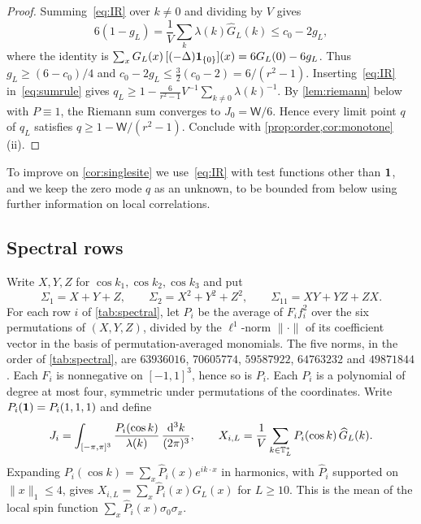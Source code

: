 \begin{proof}
Summing~\eqref{eq:IR} over $k\ne0$ and dividing by $V$ gives
\[
 6(1-g_L)=\frac1V\sum_k\lambda(k)\widehat G_L(k)\le c_0-2g_L,
\]
where the identity is $\sum_x G_L(x)\,[(-\Delta)\mathbf 1_{\{0\}}](x)=6G_L(0)-6g_L$. Thus $g_L\ge(6-c_0)/4$ and $c_0-2g_L\le\frac32(c_0-2)=6/(r^2-1)$. Inserting~\eqref{eq:IR} in~\eqref{eq:sumrule} gives $q_L\ge1-\frac6{r^2-1}V^{-1}\sum_{k\ne0}\lambda(k)^{-1}$. By \cref{lem:riemann} below with $P\equiv1$, the Riemann sum converges to $J_0=\mathsf W/6$. Hence every limit point $q$ of $q_L$ satisfies $q\ge1-\mathsf W/(r^2-1)$. Conclude with \cref{prop:order,cor:monotone}(ii).
\end{proof}

To improve on \cref{cor:singlesite} we use~\eqref{eq:IR} with test functions other than $\mathbf 1$, and we keep the zero mode $q$ as an unknown, to be bounded from below using further information on local correlations.

\subsection{Spectral rows}

Write $X,Y,Z$ for $\cos k_1,\cos k_2,\cos k_3$ and put
\[
 \Sigma_1=X+Y+Z,\qquad \Sigma_2=X^2+Y^2+Z^2,\qquad \Sigma_{11}=XY+YZ+ZX .
\]
For each row $i$ of \cref{tab:spectral}, let $P_i$ be the average of $F_if_i^2$ over the six permutations of $(X,Y,Z)$, divided by the $\ell^1$-norm $\|\cdot\|$ of its coefficient vector in the basis of permutation-averaged monomials. The five norms, in the order of \cref{tab:spectral}, are $63936016$, $70605774$, $59587922$, $64763232$ and $49871844$. Each $F_i$ is nonnegative on $[-1,1]^3$, hence so is $P_i$. Each $P_i$ is a polynomial of degree at most four, symmetric under permutations of the coordinates. Write $P_i(\mathbf 1)=P_i(1,1,1)$ and define
\[
 J_i=\int_{[-\pi,\pi]^3}\frac{P_i(\cos k)}{\lambda(k)}\,\frac{\mathrm d^3k}{(2\pi)^3},\qquad
 X_{i,L}=\frac1V\sum_{k\in\mathbb T_L^*}P_i(\cos k)\,\widehat G_L(k).
\]
Expanding $P_i(\cos k)=\sum_x\widehat P_i(x)e^{ik\cdot x}$ in harmonics, with $\widehat P_i$ supported on $\|x\|_1\le4$, gives $X_{i,L}=\sum_x\widehat P_i(x)G_L(x)$ for $L\ge10$. This is the mean of the local spin function $\sum_x\widehat P_i(x)\sigma_0\sigma_x$.

